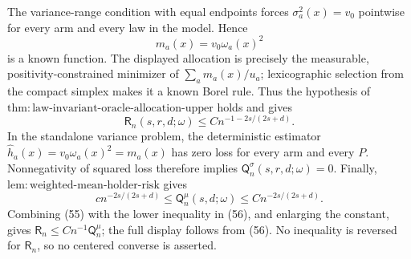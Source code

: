 The variance-range condition with equal endpoints forces \(\sigma_a^2(x)=v_0\) pointwise for every arm and every law in the model. Hence
\[
m_a(x)=v_0\omega_a(x)^2
\]
is a known function. The displayed allocation is precisely the measurable, positivity-constrained minimizer of \(\sum_a m_a(x)/u_a\); lexicographic selection from the compact simplex makes it a known Borel rule. Thus the hypothesis of \(\mathrm{thm{:}law\text{-}invariant\text{-}oracle\text{-}allocation\text{-}upper}\) holds and gives
\[
\mathsf R_n(s,r,d;\omega)\leq C n^{-1-2s/(2s+d)}.
\tag{55}
\]
In the standalone variance problem, the deterministic estimator \(\widehat h_a(x)=v_0\omega_a(x)^2=m_a(x)\) has zero loss for every arm and every \(P\). Nonnegativity of squared loss therefore implies \(\mathsf Q_n^{\sigma}(s,r,d;\omega)=0\). Finally, \(\mathrm{lem{:}weighted\text{-}mean\text{-}holder\text{-}risk}\) gives
\[
c n^{-2s/(2s+d)}
\leq\mathsf Q_n^{\mu}(s,d;\omega)
\leq C n^{-2s/(2s+d)}.
\tag{56}
\]
Combining (55) with the lower inequality in (56), and enlarging the constant, gives \(\mathsf R_n\leq Cn^{-1}\mathsf Q_n^{\mu}\); the full display follows from (56). No inequality is reversed for \(\mathsf R_n\), so no centered converse is asserted.